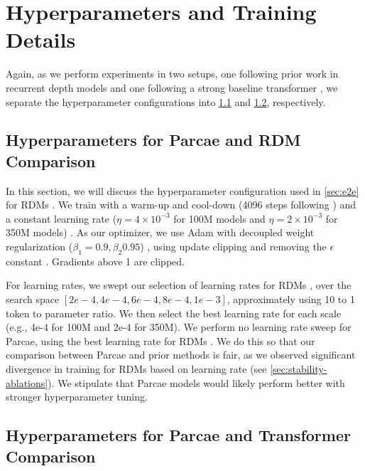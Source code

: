 \newpage

\section{Hyperparameters and Training Details}
\label{sec:hyperparameters}

Again, as we perform experiments in two setups, one following prior work in recurrent depth models \citep{geiping_scaling_2025} and one following a strong baseline transformer \citep{nanochat}, we separate the hyperparameter configurations into \cref{sec:rdm-parcae-hyp} and \cref{sec:trans-parcae-hyp}, respectively.

\subsection{Hyperparameters for Parcae and RDM Comparison}
\label{sec:rdm-parcae-hyp}
In this section, we will discuss the hyperparameter configuration used in \cref{sec:e2e} for RDMs \citep{geiping_scaling_2025}. We train with a warm-up and cool-down (4096 steps following \citep{geiping_scaling_2025}) and a constant learning rate ($\eta = 4 \times 10^{-3}$ for 100M models and $\eta = 2 \times 10^{-3}$ for 350M models) \citep{pmlr-v202-geiping23a, Zhai_2022_CVPR}. As our optimizer, we use Adam with decoupled weight regularization ($\beta_1 = 0.9, \beta_2 0.95$) \citep{kingma2017adammethodstochasticoptimization, loshchilov2019decoupledweightdecayregularization}, using update clipping \citep{wortsman2023stable} and removing the $\epsilon$ constant \citep{everett2024scalingexponentsparameterizationsoptimizers}. Gradients above 1 are clipped. 

For learning rates, we swept our selection of learning rates for RDMs \citep{geiping_scaling_2025}, over the search space $[2e-4, 4e-4, 6e-4, 8e-4, 1e-3]$, approximately using 10 to 1 token to parameter ratio. We then select the best learning rate for each scale (e.g., 4e-4 for 100M and 2e-4 for 350M). We perform no learning rate sweep for Parcae, using the best learning rate for RDMs \citep{geiping_scaling_2025}. We do this so that our comparison between Parcae and prior methods is fair, as we observed significant divergence in training for RDMs based on learning rate (see \cref{sec:stability-ablations}).
We stipulate that Parcae models would likely perform better with stronger hyperparameter tuning.

\subsection{Hyperparameters for Parcae and Transformer Comparison}
\label{sec:trans-parcae-hyp}



